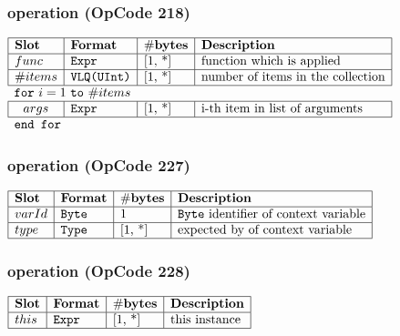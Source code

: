 \subsubsection{ operation (OpCode 218)}

\noindent
\(\begin{array}{| l | l | l | l |}
    \hline
    \bf{Slot} & \bf{Format} & \bf{\#bytes} & \bf{Description} \\
    \hline
         func & \lst{Expr} & \text{[1, *]} & \text{function which is applied} \\
    \hline
           \#items & \lst{VLQ(UInt)} & \text{[1, *]} & \text{number of items in the collection} \\
    \hline
          \multicolumn{4}{l}{\lst{for}~i=1~\lst{to}~\#items} \\
    \hline
             ~~ args & \lst{Expr} & \text{[1, *]} & \text{i-th item in list of arguments} \\
    \hline
          \multicolumn{4}{l}{\lst{end for}} \\
\end{array}\)
       

\subsubsection{ operation (OpCode 227)}

\noindent
\(\begin{array}{| l | l | l | l |}
    \hline
    \bf{Slot} & \bf{Format} & \bf{\#bytes} & \bf{Description} \\
    \hline
         varId & \lst{Byte} & \text{1} & \text{\lst{Byte} identifier of context variable} \\
    \hline
           type & \lst{Type} & \text{[1, *]} & \text{expected by of context variable} \\
    \hline
      
\end{array}\)
       

\subsubsection{ operation (OpCode 228)}

\noindent
\(\begin{array}{| l | l | l | l |}
    \hline
    \bf{Slot} & \bf{Format} & \bf{\#bytes} & \bf{Description} \\
    \hline
         this & \lst{Expr} & \text{[1, *]} & \text{this instance} \\
    \hline
      
\end{array}\)
       

